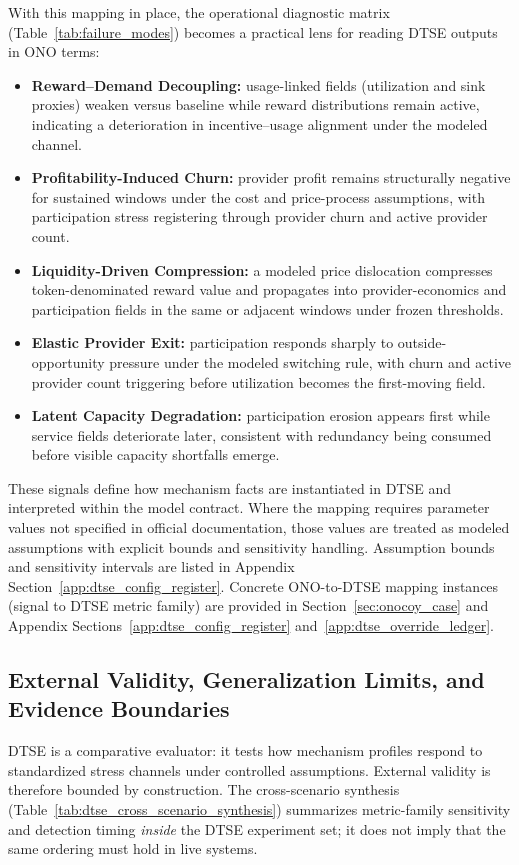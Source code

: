 With this mapping in place, the operational diagnostic matrix (Table~\ref{tab:failure_modes}) becomes a practical lens for reading DTSE outputs in ONO terms:
\begin{itemize}
    \item \textbf{Reward--Demand Decoupling:} usage-linked fields (utilization and sink proxies) weaken versus baseline while reward distributions remain active, indicating a deterioration in incentive--usage alignment under the modeled channel.
    \item \textbf{Profitability-Induced Churn:} provider profit remains structurally negative for sustained windows under the cost and price-process assumptions, with participation stress registering through provider churn and active provider count.
    \item \textbf{Liquidity-Driven Compression:} a modeled price dislocation compresses token-denominated reward value and propagates into provider-economics and participation fields in the same or adjacent windows under frozen thresholds.
    \item \textbf{Elastic Provider Exit:} participation responds sharply to outside-opportunity pressure under the modeled switching rule, with churn and active provider count triggering before utilization becomes the first-moving field.
    \item \textbf{Latent Capacity Degradation:} participation erosion appears first while service fields deteriorate later, consistent with redundancy being consumed before visible capacity shortfalls emerge.
\end{itemize}

These signals define how mechanism facts are instantiated in DTSE and interpreted within the model contract. Where the mapping requires parameter values not specified in official documentation, those values are treated as modeled assumptions with explicit bounds and sensitivity handling. Assumption bounds and sensitivity intervals are listed in Appendix Section~\ref{app:dtse_config_register}. Concrete ONO-to-DTSE mapping instances (signal to DTSE metric family) are provided in Section~\ref{sec:onocoy_case} and Appendix Sections~\ref{app:dtse_config_register} and~\ref{app:dtse_override_ledger}.

\subsection{External Validity, Generalization Limits, and Evidence Boundaries}
DTSE is a comparative evaluator: it tests how mechanism profiles respond to standardized stress channels under controlled assumptions. External validity is therefore bounded by construction. The cross-scenario synthesis (Table~\ref{tab:dtse_cross_scenario_synthesis}) summarizes metric-family sensitivity and detection timing \emph{inside} the DTSE experiment set; it does not imply that the same ordering must hold in live systems.

